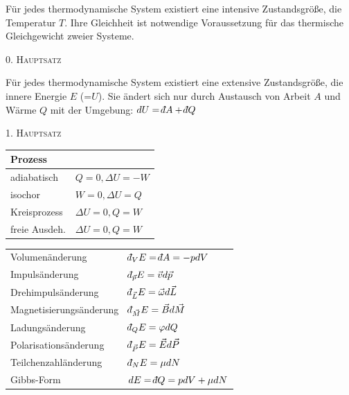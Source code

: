 \documentclass[12pt,a4paper, twoside]{article}
\renewcommand{\=}[1]{\stackrel{#1}{=}}
\def\dbar{{\mathchar'26\mkern-12mu d}}
\def\dbar{{\mathchar'26\mkern-12mu d}}
\theoremstyle{definition}
\theoremstyle{remark}
\begin{document}
\begin{center}
\begin{framed} \noindent Für jedes thermodynamische System existiert eine intensive Zustandsgröße, die Temperatur $T$. Ihre Gleichheit ist notwendige Voraussetzung für das thermische Gleichgewicht zweier Systeme.
\begin{center}\textsc{0. Hauptsatz}\end{center}\end{framed}
\end{center}

\begin{center}
\begin{framed}
\noindent Für jedes thermodynamische System existiert eine extensive Zustandsgröße, die innere Energie $E$ (=$U$). Sie ändert sich nur durch Austausch von Arbeit $A$ und Wärme $Q$ mit der Umgebung: $dU = \dbar A + \dbar Q$
\begin{center}\textsc{1. Hauptsatz}\end{center}\end{framed}
\end{center}

\begin{center}
\begin{framed}
\begin{tabular}{ll}
Prozess & \\
\midrule
adiabatisch & $Q = 0, \Delta U = -W$ \\
isochor & $W = 0, \Delta U = Q$ \\
Kreisprozess & $\Delta U = 0, Q = W$ \\
freie Ausdeh. & $\Delta U = 0, Q = W$
\end{tabular}
\end{framed}
\end{center}

\begin{center}
\begin{framed}
\begin{tabular}{ll}
Volumenänderung & $\dbar_V E = \dbar A = - p dV$\\
Impulsänderung & $\dbar_{\vec p}E = \vec v d\vec p$\\
Drehimpulsänderung & $\dbar_{\vec L}E = \vec \omega d\vec L$\\
Magnetisierungsänderung & $\dbar_{\vec M}E = \vec B d\vec M$\\
Ladungsänderung & $\dbar_Q E = \varphi dQ$\\
Polarisationsänderung & $\dbar_{\vec P}E = \vec E d\vec P$\\
Teilchenzahländerung & $\dbar_N E = \mu dN$\\
Gibbs-Form & $dE = \dbar Q = p dV + \mu dN$\\
\end{tabular}
\end{framed}
\end{center}
\end{document}
